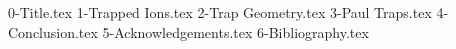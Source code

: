 \documentclass[%
 reprint,
 amsmath,amssymb,
 aps,
]{revtex4-2}
\begin{document}

{0-Title.tex}
{1-Trapped Ions.tex}
{2-Trap Geometry.tex}
{3-Paul Traps.tex}
{4-Conclusion.tex}
{5-Acknowledgements.tex}
\clearpage
{6-Bibliography.tex}
\end{document}
